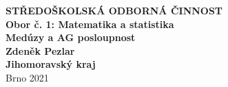 \documentclass[12pt]{report}
\begin{document}
\newcommand{\ZZ}{{\mathbb{Z}}}
\newcommand{\cyc}[1]{{\langle #1 \rangle}}


\newtheorem{veta}{Věta}[section]


\theoremstyle{de}
\newtheorem{de}{Definition}[section]
\newtheorem{dusledek}[veta]{Důsledek}
\newtheorem{lemma}[veta]{Lemma}
\newtheorem*{lemma*}{Lemma}


\theoremstyle{definition}
\newtheorem{priklad}[veta]{Příklad}
\newtheorem{definice}[veta]{Definice}
\newtheorem{problem}[veta]{Problém}
\newtheorem{znaceni}[veta]{Značení}
\newtheorem*{umluva}{Úmluva}
\newtheorem*{poznamka}{Poznámka}
\newtheorem{dfn}[veta]{Definition}


\setlength{\parindent}{2ex}

\def\Tr{\operatorname{Tr}}
\def\N{\operatorname{N}}
\def\SL{\operatorname{SL}}
\def\nsd{\operatorname{nsd}}
\def\End{\operatorname{End}}
\def\id{\operatorname{id}}
\def\char{\operatorname{char}}
\def\ker{\operatorname{ker}}
\def\Aut{\operatorname{Aut}}
\def\Gal{\operatorname{Gal}}
\def\Fix{\operatorname{Fix}}
\def\c{\operatorname{\mathbb{C}}}
\def\R{\operatorname{\mathbb{R}}}
\def\q{\operatorname{\mathbb{Q}}}
\def\e{\operatorname{\mathcal{V}}}
\def\z{\operatorname{\mathbb{Z}}}
\def\n{\operatorname{\mathbb{N}}}
\def\s{\operatorname{\subseteq}}
\def\w{\operatorname{\zeta}}
\def\fii{\operatorname{\varphi}}
\def\o{\operatorname{\mathcal{O}}}
\def\I{\operatorname{\mathcal{I}}}
\def\J{\operatorname{\mathcal{J}}}
\def\P{\operatorname{\mathcal{P}}}
\def\pn{\operatorname{\mathfrak{P}}}
\def\pn{\operatorname{\mathfrak{p}}}
\def\res{\operatorname{res}}
\def\ord{\operatorname{ord}}
\def\AG{\operatorname{AG}}
\setlength{\emergencystretch}{3em}


\begin{titlepage}
{
\centering
\LARGE \textbf{STŘEDOŠKOLSKÁ ODBORNÁ ČINNOST}\\
\Large\textbf{Obor č. 1: Matematika a statistika}\\
\vspace{6cm}
\LARGE\textbf{Medúzy a AG posloupnost}\\
}
\vspace{10cm}
{\noindent\large\bfseries Zdeněk Pezlar\\ 
	\large\bfseries Jihomoravský kraj\\ }
\center\large Brno 2021
	
\end{titlepage}
\end{document}
